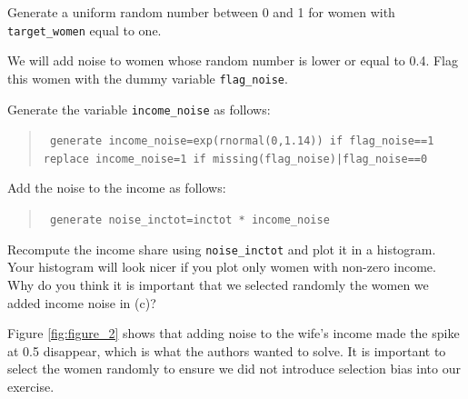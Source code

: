 \documentclass[a4paper, 11pt,addpoints,answers]{exam}
\begin{document}
\begin{questions}
		\bitem 
		\item Generate a uniform random number between 0 and 1 for women with {\tt target\_women} equal to one. 
		\item We will add noise to women whose random number is lower or equal to 0.4. Flag this women with the dummy variable {\tt flag\_noise}.
		\item Generate the variable {\tt income\_noise} as follows:
		\begin{quote} 
			{\tt
			generate income\_noise=exp(rnormal(0,1.14)) if flag\_noise==1 \\
			replace  income\_noise=1 if missing(flag\_noise)|flag\_noise==0
		}
		\end{quote}
		\item Add the noise to the income as follows:
		\begin{quote} 
			{\tt
				generate noise\_inctot=inctot * income\_noise
			}
		\end{quote}
		\eitem 
	\eenu 
	Recompute the income share using {\tt noise\_inctot} and plot it in a histogram. Your histogram will look nicer if you plot only women with non-zero income. Why do you think it is important that we selected randomly the women we added income noise in (c)?
	\begin{solution}
		Figure \ref{fig:figure_2} shows that adding noise to the wife's income made the spike at 0.5 disappear, which is what the authors wanted to solve. It is important to select the women randomly to ensure we did not introduce selection bias into our exercise.
	
		
	\end{solution}
\newpage

\end{questions}
\end{document}
